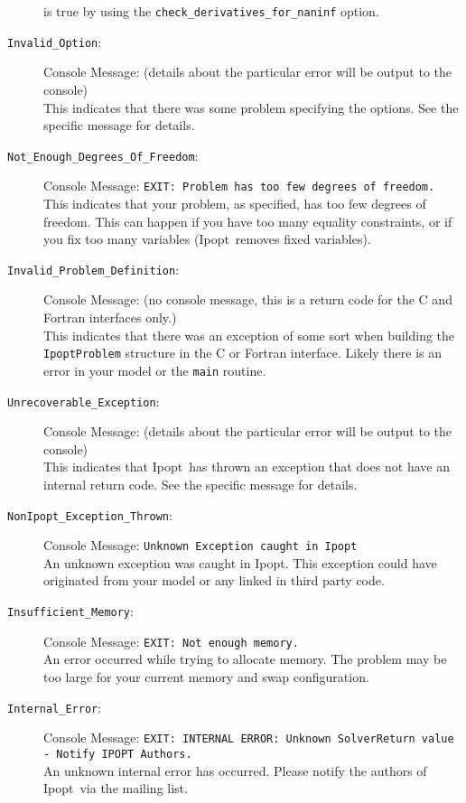 \documentclass[10pt]{article}
\newcommand{\Ipopt}{{\sc Ipopt}}
\begin{document}
\begin{description}
  is true by using the {\tt check\_derivatives\_for\_naninf} option.
\item[{\tt Invalid\_Option}:]  $\;$ \\
  Console Message: (details about the particular error
  will be output to the console) \\
  This indicates that there was some problem specifying the options.
  See the specific message for details.
\item[{\tt Not\_Enough\_Degrees\_Of\_Freedom}:]  $\;$ \\
  Console Message: {\tt EXIT: Problem has too few degrees of freedom.} \\
  This indicates that your problem, as specified, has too few degrees
  of freedom. This can happen if you have too many equality
  constraints, or if you fix too many variables (\Ipopt\ removes fixed
  variables).
\item[{\tt Invalid\_Problem\_Definition}:]  $\;$ \\
  Console Message: (no console message, this is a return code for the
  C and Fortran interfaces only.) \\
  This indicates that there was an exception of some sort when
  building the {\tt IpoptProblem} structure in the C or Fortran
  interface. Likely there is an error in your model or the {\tt main}
  routine.
\item[{\tt Unrecoverable\_Exception}:]  $\;$ \\
  Console Message: (details about the particular error
  will be output to the console) \\
  This indicates that \Ipopt\ has thrown an exception that does not
  have an internal return code. See the specific message for details.
\item[{\tt NonIpopt\_Exception\_Thrown}:]  $\;$ \\
  Console Message: {\tt Unknown Exception caught in Ipopt} \\
  An unknown exception was caught in \Ipopt. This exception could have
  originated from your model or any linked in third party code.
\item[{\tt Insufficient\_Memory}:]  $\;$ \\
  Console Message: {\tt EXIT: Not enough memory.} \\
  An error occurred while trying to allocate memory. The problem may
  be too large for your current memory and swap configuration.
\item[{\tt Internal\_Error}:]  $\;$ \\
  Console Message: {\tt EXIT: INTERNAL ERROR: Unknown SolverReturn
    value - Notify IPOPT Authors.} \\
  An unknown internal error has occurred. Please notify the authors of
  \Ipopt\ via the mailing list.

\end{description}
\end{document}

